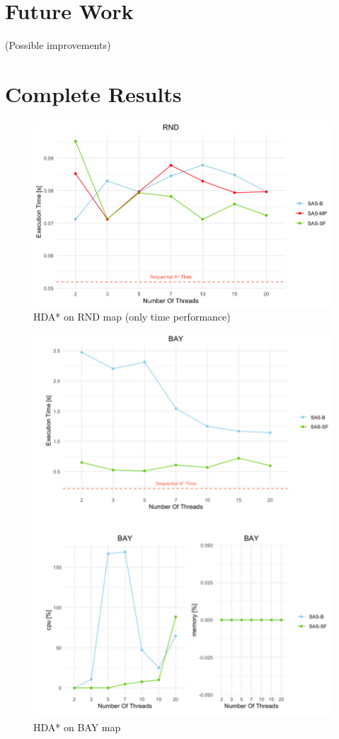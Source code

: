 \documentclass[twocolumn, switch]{article} %
\begin{document}
\section{Future Work}
(Possible improvements)

\section{Complete Results}
\begin{figure}[ht!]
  \centering
  \includegraphics[width=1\linewidth]{hda/rnd.png}
  \caption{HDA* on RND map (only time performance)}
  \label{hdarnd}
\end{figure}
\begin{center}
  \begin{figure}[ht!]
    \centering
    \includegraphics[width=1\linewidth]{hda/bay.png}
    \caption{HDA* on BAY map}
    \label{hdabay}
  \end{figure}
\end{center}
\end{document}
